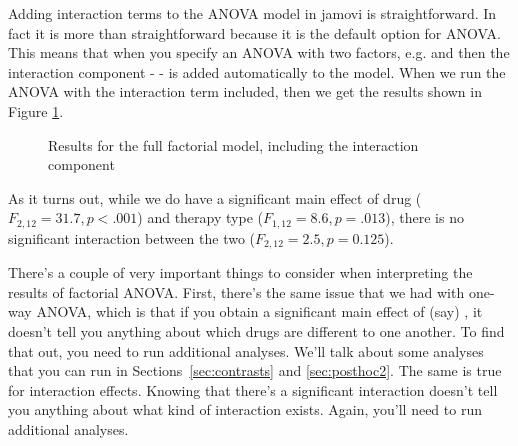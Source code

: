 
Adding interaction terms to the ANOVA model in jamovi is straightforward. In fact it is more than straightforward because it is the default option for ANOVA. This means that when you specify an ANOVA with two factors, e.g.  and  then the interaction component -  - is added automatically to the model. When we run the ANOVA with the interaction term included, then we get the results shown in Figure \ref{fig:factorialanova4}. 

\begin{figure}[!htb]
\begin{center}
\caption{Results for the full factorial model, including the interaction component }
\label{fig:factorialanova4}
\HR
\end{center}
\end{figure}

As it turns out, while we do have a significant main effect of drug ($F_{2,12} = 31.7, p <.001$) and therapy type ($F_{1,12} = 8.6, p=.013$), there is no significant interaction between the two ($F_{2,12} = 2.5, p = 0.125$).


There's a couple of very important things to consider when interpreting the results of factorial ANOVA. First, there's the same issue that we had with one-way ANOVA, which is that if you obtain a significant main effect of (say) , it doesn't tell you anything about which drugs are different to one another. To find that out, you need to run additional analyses. We'll talk about some analyses that you can run in Sections~\ref{sec:contrasts} and \ref{sec:posthoc2}. The same is true for interaction effects. Knowing that there's a significant interaction doesn't tell you anything about what kind of interaction exists. Again, you'll need to run additional analyses. 

